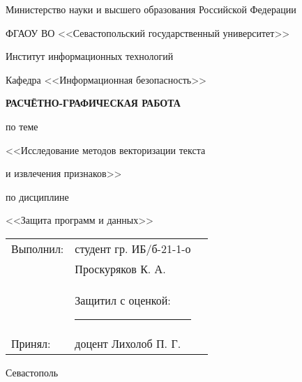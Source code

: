 \documentclass[14pt, a4paper, titlepage]{extarticle}
\begin{document}
    \begin{titlepage}
        \pagestyle{empty}
        \setlength\parindent{0pt}

        \begin{center}
            Министерство науки и высшего образования Российской Федерации

            ФГАОУ ВО <<Севастопольский государственный университет>>

            Институт информационных технологий
        \end{center}

        \bigskip
        \bigskip

        \begin{flushright}
            Кафедра <<Информационная безопасность>>
        \end{flushright}

        \bigskip
        \bigskip
        \bigskip

        \begin{center}
            \textbf{РАСЧЁТНО-ГРАФИЧЕСКАЯ РАБОТА}

            по теме

            <<Исследование методов векторизации текста

            и извлечения признаков>>

            по дисциплине

            <<Защита программ и данных>>
        \end{center}

        \bigskip
        \bigskip
        \bigskip
        \bigskip

        \begin{flushright}
            \begin{tabularx}{265pt}{lr@{\quad}X}
                \multicolumn{1}{l}{Выполнил:} & \multicolumn{1}{l}{студент гр. ИБ/б-21-1-о} \\
                                              & \multicolumn{1}{l}{Проскуряков К. А.} \\
                                              & \multicolumn{1}{l}{Защитил с оценкой: \rule{1.2cm}{0.25mm}} \\
                \multicolumn{1}{l}{Принял:}   & \multicolumn{1}{l}{доцент Лихолоб П. Г.}
            \end{tabularx}       
        \end{flushright}

        \begin{center}
            \vfill
            Севастополь

            \the\year{}
        \end{center}
    \end{titlepage}
\end{document}
